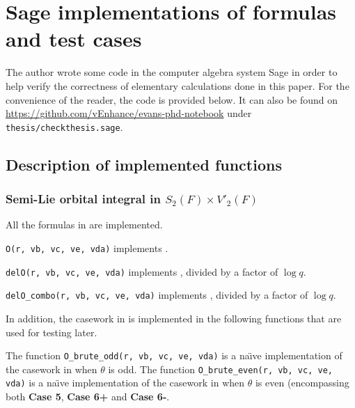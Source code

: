 \chapter{Sage implementations of formulas and test cases}
The author wrote some code in the computer algebra system Sage
in order to help verify the correctness of elementary calculations done in this paper.
For the convenience of the reader, the code is provided below.
It can also be found on \url{https://github.com/vEnhance/evans-phd-notebook}
under \texttt{thesis/checkthesis.sage}.

\section{Description of implemented functions}
\subsection{Semi-Lie orbital integral in $S_2(F) \times V'_2(F)$}
All the formulas in  are implemented.
\begin{itemize}
  \ii \texttt{O(r, vb, vc, ve, vda)}
  implements .

  \ii \texttt{delO(r, vb, vc, ve, vda)}
  implements ,
  divided by a factor of $\log q$.

  \ii \texttt{delO\_combo(r, vb, vc, ve, vda)}
  implements ,
  divided by a factor of $\log q$.
\end{itemize}

In addition, the casework in  is implemented
in the following functions that are used for testing later.
\begin{itemize}
  \ii The function \texttt{O\_brute\_odd(r, vb, vc, ve, vda)}
  is a na\"{\i}ve implementation of the casework in  when $\theta$ is odd.
  \ii The function \texttt{O\_brute\_even(r, vb, vc, ve, vda)}
  is a na\"{\i}ve implementation of the casework in  when $\theta$ is even
  (encompassing both \textbf{Case 5}, \textbf{Case 6\ts+} and \textbf{Case 6\ts-}.
\end{itemize}

